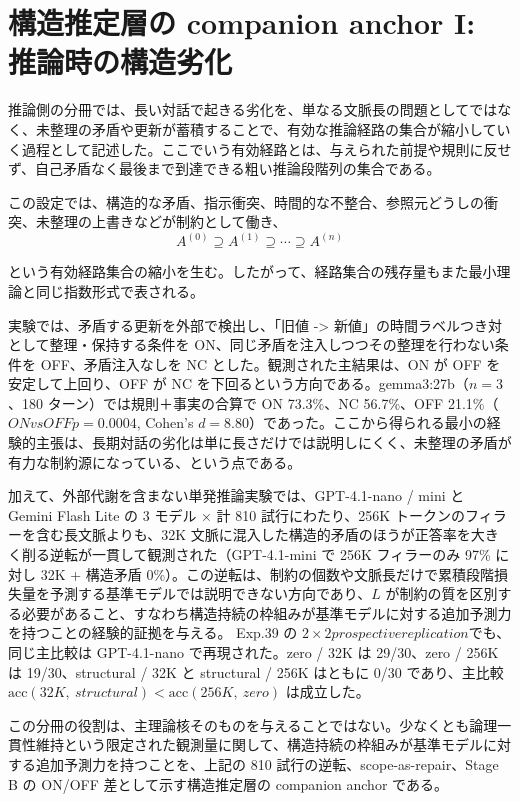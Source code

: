 \documentclass[12pt,a4paper]{article}
\begin{document}
\section{構造推定層の companion anchor I: 推論時の構造劣化}\label{ux69cbux9020ux63a8ux5b9aux5c64ux306e-companion-anchor-i-ux63a8ux8ad6ux6642ux306eux69cbux9020ux52a3ux5316}

推論側の分冊では、長い対話で起きる劣化を、単なる文脈長の問題としてではなく、未整理の矛盾や更新が蓄積することで、有効な推論経路の集合が縮小していく過程として記述した。ここでいう有効経路とは、与えられた前提や規則に反せず、自己矛盾なく最後まで到達できる粗い推論段階列の集合である。

この設定では、構造的な矛盾、指示衝突、時間的な不整合、参照元どうしの衝突、未整理の上書きなどが制約として働き、 \[
A^{(0)} \supseteq A^{(1)} \supseteq \cdots \supseteq A^{(n)}
\]

という有効経路集合の縮小を生む。したがって、経路集合の残存量もまた最小理論と同じ指数形式で表される。

実験では、矛盾する更新を外部で検出し、「旧値 -\textgreater{} 新値」の時間ラベルつき対として整理・保持する条件を ON、同じ矛盾を注入しつつその整理を行わない条件を OFF、矛盾注入なしを NC とした。観測された主結果は、ON が OFF を安定して上回り、OFF が NC を下回るという方向である。gemma3:27b（\(n=3\)、180 ターン）では規則＋事実の合算で ON 73.3\%、NC 56.7\%、OFF 21.1\%（\(ON vs OFF p = 0.0004\), Cohen's \(d = 8.80\)）であった。ここから得られる最小の経験的主張は、長期対話の劣化は単に長さだけでは説明しにくく、未整理の矛盾が有力な制約源になっている、という点である。

加えて、外部代謝を含まない単発推論実験では、GPT-4.1-nano / mini と Gemini Flash Lite の 3 モデル × 計 810 試行にわたり、256K トークンのフィラーを含む長文脈よりも、32K 文脈に混入した構造的矛盾のほうが正答率を大きく削る逆転が一貫して観測された（GPT-4.1-mini で 256K フィラーのみ 97\% に対し 32K + 構造矛盾 0\%）。この逆転は、制約の個数や文脈長だけで累積段階損失量を予測する基準モデルでは説明できない方向であり、\(L\) が制約の質を区別する必要があること、すなわち構造持続の枠組みが基準モデルに対する追加予測力を持つことの経験的証拠を与える。 Exp.39 の \(2\times2 prospective replication\)でも、同じ主比較は GPT-4.1-nano で再現された。zero / 32K は 29/30、zero / 256K は 19/30、structural / 32K と structural / 256K はともに 0/30 であり、主比較 \(\mathrm{acc}(32K,\ structural) < \mathrm{acc}(256K,\ zero)\) は成立した。

この分冊の役割は、主理論核そのものを与えることではない。少なくとも論理一貫性維持という限定された観測量に関して、構造持続の枠組みが基準モデルに対する追加予測力を持つことを、上記の 810 試行の逆転、scope-as-repair、Stage B の ON/OFF 差として示す構造推定層の companion anchor である。
\end{document}
